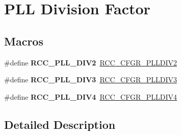 \hypertarget{group___r_c_c___p_l_l___division___factor}{\section{P\-L\-L Division Factor}
\label{group___r_c_c___p_l_l___division___factor}
}
\subsection*{Macros}
\begin{DoxyCompactItemize}
\item 
\hypertarget{group___r_c_c___p_l_l___division___factor_gaa99ce6d8bb2024b91859445ea6dd6e8f}{\#define {\bfseries R\-C\-C\-\_\-\-P\-L\-L\-\_\-\-D\-I\-V2}~\hyperlink{group___peripheral___registers___bits___definition_ga6d0b498f4f0ec257aa80334e622046f0}{R\-C\-C\-\_\-\-C\-F\-G\-R\-\_\-\-P\-L\-L\-D\-I\-V2}}\label{group___r_c_c___p_l_l___division___factor_gaa99ce6d8bb2024b91859445ea6dd6e8f}

\item 
\hypertarget{group___r_c_c___p_l_l___division___factor_ga08f44363e494f7ab9259e1c64b981dd2}{\#define {\bfseries R\-C\-C\-\_\-\-P\-L\-L\-\_\-\-D\-I\-V3}~\hyperlink{group___peripheral___registers___bits___definition_ga51d7c69f6894bf138b9d4c5682ea1a32}{R\-C\-C\-\_\-\-C\-F\-G\-R\-\_\-\-P\-L\-L\-D\-I\-V3}}\label{group___r_c_c___p_l_l___division___factor_ga08f44363e494f7ab9259e1c64b981dd2}

\item 
\hypertarget{group___r_c_c___p_l_l___division___factor_ga2632cb3df857c806ea08a4482df5daa6}{\#define {\bfseries R\-C\-C\-\_\-\-P\-L\-L\-\_\-\-D\-I\-V4}~\hyperlink{group___peripheral___registers___bits___definition_ga287acb80daf1c57a41971a9a25beff81}{R\-C\-C\-\_\-\-C\-F\-G\-R\-\_\-\-P\-L\-L\-D\-I\-V4}}\label{group___r_c_c___p_l_l___division___factor_ga2632cb3df857c806ea08a4482df5daa6}

\end{DoxyCompactItemize}


\subsection{Detailed Description}

